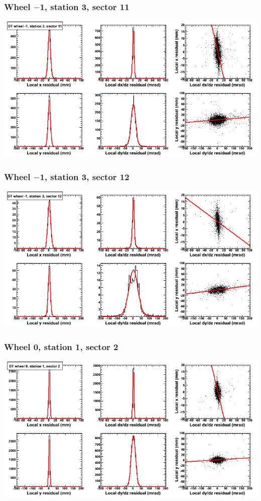 \documentclass[compress]{beamer}
\begin{document}
\begin{frame}
\frametitle{Wheel $-$1, station 3, sector 11}
\includegraphics[width=\linewidth]{tmpbell_MBwhBst3sec11.png}
\end{frame}

\begin{frame}
\frametitle{Wheel $-$1, station 3, sector 12}
\includegraphics[width=\linewidth]{tmpbell_MBwhBst3sec12.png}
\end{frame}

\begin{frame}
\frametitle{Wheel 0, station 1, sector 2}
\includegraphics[width=\linewidth]{tmpbell_MBwhCst1sec02.png}
\end{frame}
\end{document}
